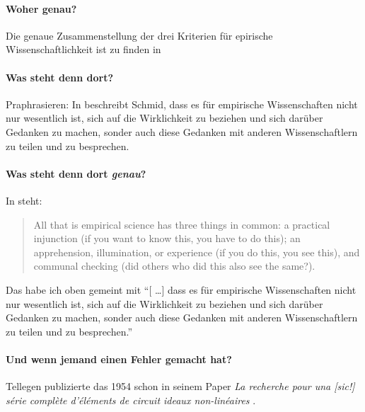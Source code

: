 \paragraph{Woher genau?}
Die genaue Zusammenstellung der drei Kriterien für epirische Wissenschaftlichkeit ist zu finden in \cite[S.~80]{Schmid2003}

\paragraph{Was steht denn dort?}
Praphrasieren: In \cite{Schmid2003} beschreibt Schmid, dass es für empirische Wissenschaften nicht nur wesentlich ist, sich auf die Wirklichkeit zu beziehen und sich darüber Gedanken zu machen, sonder auch diese Gedanken mit anderen Wissenschaftlern zu teilen und zu besprechen.

\paragraph{Was steht denn dort \emph{genau}?}
In \cite{Schmid2003} steht:
\begin{quote}
All that is empirical science has three things in
common: a practical injunction (if you want to know
this, you have to do this); an apprehension, illumination, or experience (if you do this, you see this), and communal checking (did others who did this also see the same?).
\end{quote}
Das habe ich oben gemeint mit \enquote{[ \ldots ] dass es für empirische Wissenschaften nicht nur wesentlich ist, sich auf die Wirklichkeit zu beziehen und sich darüber Gedanken zu machen, sonder auch diese Gedanken mit anderen Wissenschaftlern zu teilen und zu besprechen.}

\paragraph{Und wenn jemand einen Fehler gemacht hat?}
Tellegen publizierte das 1954 schon in seinem Paper \emph{La recherche pour una [sic!] s{\'e}rie compl{\`e}te d’{\'e}l{\'e}ments de circuit ideaux non-lin{\'e}aires} \cite{Tellegen1954}.